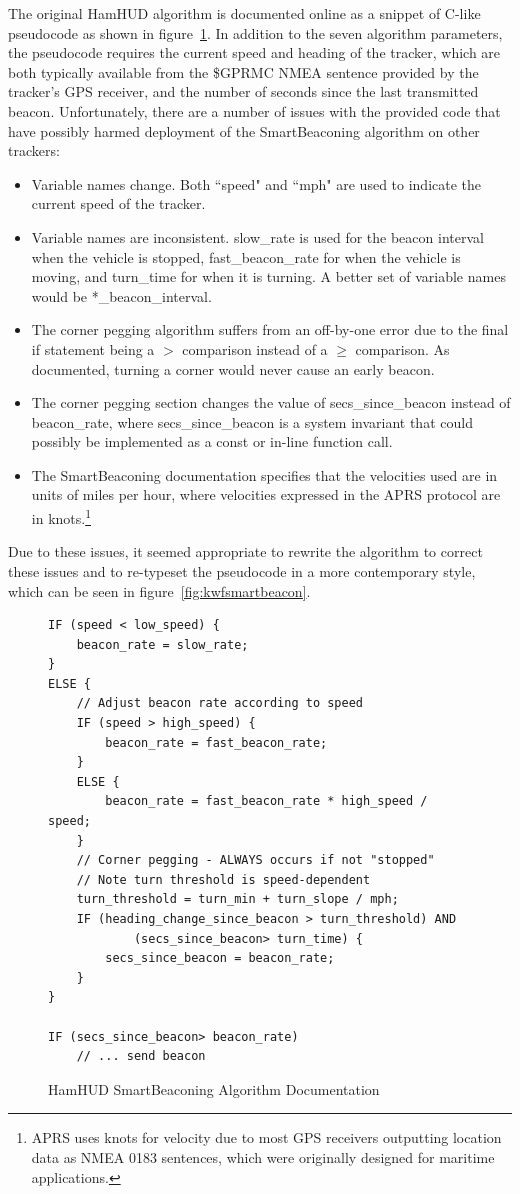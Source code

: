 The original HamHUD algorithm is documented online as a snippet of C-like 
pseudocode as shown in figure~\ref{fig:hamhudsmartbeacon}.
In addition to the seven algorithm parameters, the pseudocode
requires the current speed and heading of the tracker, which are both
typically available from the \$GPRMC NMEA sentence \cite{nmearmc} provided by the 
tracker's GPS receiver, and the number of seconds since the last transmitted beacon.
Unfortunately, there are a number of issues with the provided code that
have possibly harmed deployment of the SmartBeaconing algorithm on other trackers:
\begin{itemize}
	\item Variable names change. Both ``speed" and ``mph" are used 
		to indicate the current speed of the tracker.
	\item Variable names are inconsistent. 
		slow\_rate is used for the beacon interval when the vehicle is stopped, 
		fast\_beacon\_rate for when the vehicle is moving,
		and turn\_time for when it is turning.
		A better set of variable names would be *\_beacon\_interval.
	\item The corner pegging algorithm suffers from an off-by-one error due to
		the final if statement being a $>$ comparison instead
		of a $\geq$ comparison. As documented, turning a corner would
		never cause an early beacon.
	\item The corner pegging section changes the value of secs\_since\_beacon
		instead of beacon\_rate, where secs\_since\_beacon is a system
		invariant that could possibly be implemented as a const
		or in-line function call.
	\item The SmartBeaconing documentation specifies that 
		the velocities used are in units
		of miles per hour, where velocities expressed in the APRS
		protocol are in knots.\footnote{APRS uses knots for velocity
			due to most GPS receivers outputting location
			data as NMEA 0183 sentences, which were originally designed 
			for maritime applications.}
\end{itemize}

Due to these issues, it seemed appropriate to rewrite the algorithm 
to correct these issues and to re-typeset the pseudocode in a more
contemporary style, which can be seen in figure~\ref{fig:kwfsmartbeacon}.

\begin{figure}[p]
\begin{lstlisting}
IF (speed < low_speed) {
	beacon_rate = slow_rate;
}
ELSE {
	// Adjust beacon rate according to speed
	IF (speed > high_speed) {
		beacon_rate = fast_beacon_rate;
	}
	ELSE {
		beacon_rate = fast_beacon_rate * high_speed / speed;
	}
	// Corner pegging - ALWAYS occurs if not "stopped"
	// Note turn threshold is speed-dependent
	turn_threshold = turn_min + turn_slope / mph;
	IF (heading_change_since_beacon > turn_threshold) AND
			(secs_since_beacon> turn_time) {
		secs_since_beacon = beacon_rate;
	}
}

IF (secs_since_beacon> beacon_rate)
	// ... send beacon
\end{lstlisting}
\caption{HamHUD SmartBeaconing Algorithm Documentation}
\label{fig:hamhudsmartbeacon}
\end{figure}

